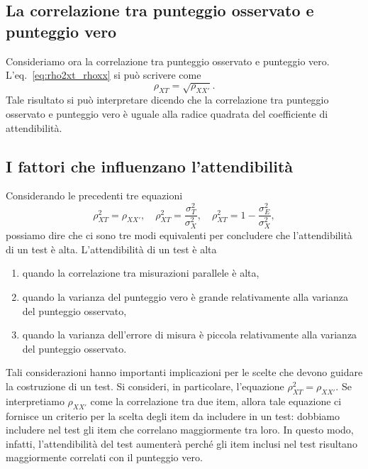 \subsection{La correlazione tra punteggio osservato e punteggio vero}

Consideriamo ora la correlazione tra punteggio osservato e punteggio vero. 
L'eq.~\ref{eq:rho2xt_rhoxx} si può scrivere come
\begin{equation}
\rho_{XT} = \sqrt{\rho_{XX'}}.
\end{equation}
Tale risultato si può interpretare dicendo che la correlazione tra punteggio osservato  e punteggio vero è uguale alla radice quadrata del coefficiente di attendibilità.

\subsection{I fattori che influenzano l'attendibilità}

Considerando le precedenti tre equazioni
\[
\rho^2_{XT} = \rho_{XX'},\quad 
\rho_{XT}^2 = \frac{\sigma_{T}^2}{\sigma_X^2}, \quad
\rho_{XT}^2 = 1-\frac{\sigma_{E}^2}{\sigma_X^2},
\]
possiamo dire che ci sono tre modi equivalenti per concludere che l'attendibilità di un test è alta. L'attendibilità di un test è alta  
\begin{enumerate}
\item quando la correlazione tra misurazioni parallele è alta,
\item quando la varianza del punteggio vero è grande relativamente alla
  varianza del punteggio osservato,
\item quando la varianza dell'errore di misura è piccola relativamente  alla varianza del punteggio osservato.
\end{enumerate}
Tali considerazioni hanno importanti implicazioni per le scelte che devono guidare la costruzione di un test. Si consideri, in  particolare, l'equazione
$
\rho^2_{XT} =  \rho_{XX'}
$.
Se interpretiamo $\rho_{XX'}$ come la correlazione tra due item, allora tale equazione ci fornisce un criterio  per la scelta degli item da includere in un test: dobbiamo includere nel test gli item che correlano maggiormente tra loro. In questo modo, infatti, l'attendibilità del test aumenterà perché gli item inclusi nel test risultano maggiormente correlati con il punteggio vero.


